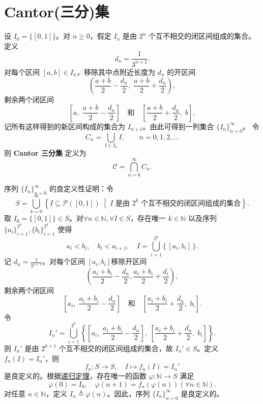 \documentclass[../../main.tex]{subfiles}%
\begin{document}
\section{Cantor(三分)集}

\begin{definition}[Cantor三分集]\label{definition:Cantor三分集}
设 \( I_0 = \{[0,1]\} \)。对 \( n \geqslant 0 \)，假定 \( I_n \) 是由 \( 2^n \) 个互不相交的闭区间组成的集合。定义
\[
d_n = \frac{1}{3^{n+1}}.
\]
对每个区间 \([a,b] \in I_n\)，移除其中点附近长度为 \( d_n \) 的开区间
\[
\left( \frac{a+b}{2} - \frac{d_n}{2},\; \frac{a+b}{2} + \frac{d_n}{2} \right),
\]
剩余两个闭区间
\[
\left[ a,\; \frac{a+b}{2} - \frac{d_n}{2} \right] \quad\text{和}\quad \left[ \frac{a+b}{2} + \frac{d_n}{2},\; b \right],
\]
记所有这样得到的新区间构成的集合为 \( I_{n+1} \)。由此可得到一列集合 \(\{I_n\}_{n=0}^{\infty}\)。
令
\[
C_n = \bigcup_{I \in I_n} I, \qquad n = 0,1,2,\dots
\]
则 \textbf{Cantor 三分集} 定义为
\[
\mathcal{C} = \bigcap_{n=0}^{\infty} C_n.
\]
\end{definition}
\begin{remark}
序列 \(\{I_n\}_{n=0}^{\infty}\) 的良定义性证明：令
\[
S = \bigcup_{k=0}^{\infty} \left\{ I \subseteq \mathcal{P}([0,1]) \;\middle|\; I \text{ 是由 } 2^k \text{ 个互不相交的闭区间组成的集合} \right\}.
\]
取 \( I_0 = \{[0,1]\} \in S \)。对\(\forall n \in \mathbb{N},\forall I \in S \)，存在唯一 \( k \in \mathbb{N} \) 以及序列 \(\{a_i\}_{i=1}^{2^k},\{b_i\}_{i=1}^{2^k}\) 使得
\[
a_i < b_i,\quad b_i < a_{i+1},\quad I = \bigcup_{i=1}^{2^k} \{\,[a_i,b_i]\,\}.
\]
记 \( d_n = \frac{1}{3^{n+1}} \)。对每个区间 \([a_i, b_i]\)移除开区间
\[
\left( \frac{a_i+b_i}{2}-\frac{d_n}{2},\frac{a_i+b_i}{2}+\frac{d_i}{2} \right) ,
\]
剩余两个闭区间
\[
\left[ a_i,\;\frac{a_i+b_i}{2}-\frac{d_n}{2} \right] \quad \text{和}\quad \left[ \frac{a_i+b_i}{2}+\frac{d_n}{2},\;b_i \right] .
\]
令
\[
I_n' =\bigcup_{i=1}^{2^k}{\left\{ \left[ a_i,\;\frac{a_i+b_i}{2}-\frac{d_n}{2} \right] ,\;\left[ \frac{a_i+b_i}{2}+\frac{d_n}{2},\;b_i \right] \right\}}.
\]
则 \( I_n' \) 是由 \( 2^{k+1} \) 个互不相交的闭区间组成的集合，故 \( I_n' \in S \)。定义 \( f_n(I) = I_n' \)，则
\[
f_n : S \to S,\quad I \mapsto f_n(I) = I_n'
\]
是良定义的。根据\hyperref[Set-Theory-theorem:递归定理]{递归定理}，存在唯一的函数 \( \varphi : \mathbb{N} \to S \) 满足
\[
\varphi(0) = I_0,\quad \varphi(n+1) = f_n(\varphi(n))(\forall n \in \mathbb{N}).
\]
对任意 \( n \in \mathbb{N} \)，定义 \( I_n \triangleq \varphi(n) \)。因此，序列 \(\{I_n\}_{n=0}^{\infty}\) 是良定义的。
\end{remark}
\end{document}
